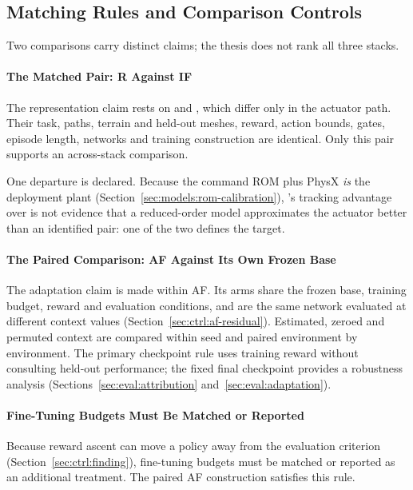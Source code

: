 \subsection{Matching Rules and Comparison Controls}
\label{sec:ctrl:matching}

Two comparisons carry distinct claims; the thesis does not rank all three
stacks.

\paragraph{The Matched Pair: R Against IF}
The representation claim rests on \ppoROM{} and \ppoIDFD, which differ only in
the actuator path. Their task, paths, terrain and held-out meshes, reward,
action bounds, gates, episode length, networks and training construction are
identical. Only this pair supports an across-stack comparison.

One departure is declared. Because the command ROM plus PhysX \emph{is} the
deployment plant (Section~\ref{sec:models:rom-calibration}), \ppoROM's tracking
advantage over \ppoIDFD{} is not evidence that a reduced-order model
approximates the actuator better than an identified pair: one of the two defines
the target.

\paragraph{The Paired Comparison: AF Against Its Own Frozen Base}
The adaptation claim is made within AF. Its arms share the frozen base,
training budget, reward and evaluation conditions, and are the same network
evaluated at different context values (Section~\ref{sec:ctrl:af-residual}).
Estimated, zeroed and permuted context are compared within seed and paired
environment by environment. The
primary checkpoint rule uses training reward without consulting held-out
performance; the fixed final checkpoint provides a robustness analysis
(Sections~\ref{sec:eval:attribution} and~\ref{sec:eval:adaptation}).

\paragraph{Fine-Tuning Budgets Must Be Matched or Reported}
Because reward ascent can move a policy away from the evaluation criterion
(Section~\ref{sec:ctrl:finding}), fine-tuning budgets must be matched or reported
as an additional treatment. The paired AF construction satisfies this rule.
